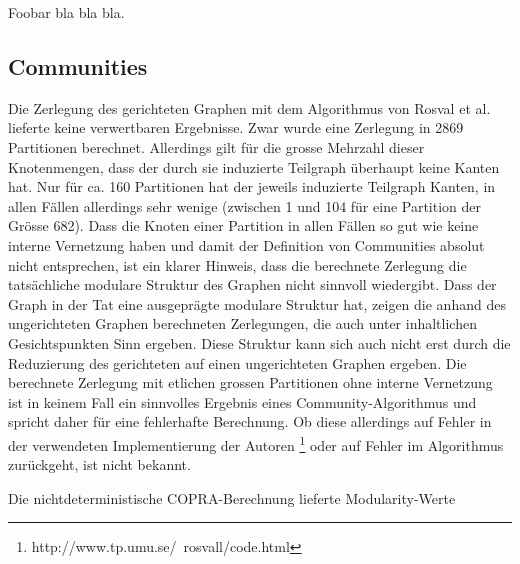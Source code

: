 Foobar bla bla bla.

\subsection{Communities}
\label{sec:result-communities}

Die Zerlegung des gerichteten Graphen mit dem Algorithmus von Rosval
et al. lieferte keine verwertbaren Ergebnisse. Zwar wurde eine
Zerlegung in 2869 Partitionen berechnet. Allerdings gilt f\"ur die
grosse Mehrzahl dieser Knotenmengen, dass der durch sie induzierte
Teilgraph \"uberhaupt keine Kanten hat. Nur f\"ur ca. 160 Partitionen
hat der jeweils induzierte Teilgraph Kanten, in allen F\"allen
allerdings sehr wenige (zwischen 1 und 104 f\"ur eine Partition der
Gr\"osse 682). Dass die Knoten einer Partition in allen F\"allen so
gut wie keine interne Vernetzung haben und damit der Definition von
Communities absolut nicht entsprechen, ist ein klarer Hinweis, dass
die berechnete Zerlegung die tats\"achliche modulare Struktur des
Graphen nicht sinnvoll wiedergibt. Dass der Graph in der Tat eine
ausgepr\"agte modulare Struktur hat, zeigen die anhand des
ungerichteten Graphen berechneten Zerlegungen, die auch unter
inhaltlichen Gesichtspunkten Sinn ergeben. Diese Struktur kann sich
auch nicht erst durch die Reduzierung des gerichteten auf einen
ungerichteten Graphen ergeben. Die berechnete Zerlegung mit etlichen
grossen Partitionen ohne interne Vernetzung ist in keinem Fall ein
sinnvolles Ergebnis eines Community-Algorithmus und spricht daher
f\"ur eine fehlerhafte Berechnung. Ob diese allerdings auf Fehler in
der verwendeten Implementierung der Autoren
\footnote{http://www.tp.umu.se/~rosvall/code.html} oder auf Fehler im
Algorithmus zur\"uckgeht, ist nicht bekannt.

Die nichtdeterministische COPRA-Berechnung lieferte Modularity-Werte 

